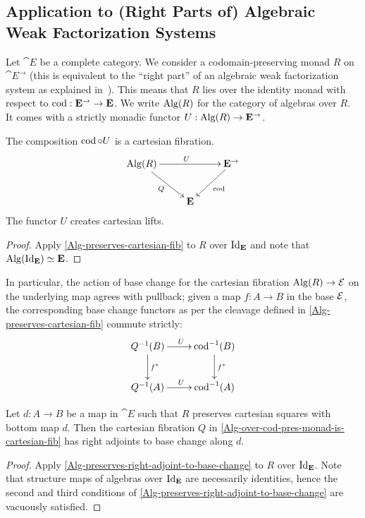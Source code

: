 \documentclass[reqno,10pt,a4paper,oneside]{amsart}
\begin{document}
\subsection{Application to (Right Parts of) Algebraic Weak Factorization Systems}

Let $\cat{E}$ be a complete category.
We consider a codomain-preserving monad $R$ on $\cat{E}^{\to}$ (this is equivalent to the ``right part'' of an algebraic weak factorization system as explained in~\cite{garner:small-object-argument}).
This means that $R$ lies over the identity monad with respect to $\operatorname{cod} : \mathbf{E}^{\to} \to \mathbf{E}$.
We write $\operatorname{Alg}(R)$ for the category of algebras over $R$.
It comes with a strictly monadic functor $U : \operatorname{Alg}(R) \to \mathbf{E}^{\to}$.

\begin{corollary}
\label{Alg-over-cod-pres-monad-is-cartesian-fib}
The composition $\operatorname{cod} \mathbin{\circ} U$ is a cartesian fibration.
\[
\xymatrix{
  \Alg(R)
  \ar[rr]^{U}
  \ar[dr]_{Q}
&&
  \cat{E}^{\to}
  \ar[dl]^{\cod}
\\&
  \cat{E}
}
\]
The functor $U$ creates cartesian lifts.
\end{corollary}

\begin{proof}
Apply \cref{Alg-preserves-cartesian-fib} to $R$ over $\operatorname{Id}_{\mathbf{E}}$ and note that $\operatorname{Alg}(\operatorname{Id}_{\mathbf{E}}) \simeq \mathbf{E}$.
\end{proof}

In particular, the action of base change for the cartesian fibration $\operatorname{Alg}(R) \to \mathcal{E}$ on the underlying map agrees with pullback; given a map $f : A \to B$ in the base $\mathcal{E}$, the corresponding base change functors as per the cleavage defined in \cref{Alg-preserves-cartesian-fib} commute strictly:
\[
\xymatrix{
  Q^{-1}(B)
  \ar[r]^{U}
  \ar[d]^{f^*}
&
  \cod^{-1}(B)
  \ar[d]^{f^*}
\\
  Q^{-1}(A)
  \ar[r]^{U}
&
  \cod^{-1}(A)
}
\]

\begin{corollary}
Let $d : A \to B$ be a map in $\cat{E}$ such that $R$ preserves cartesian squares with bottom map $d$.
Then the cartesian fibration $Q$ in \cref{Alg-over-cod-pres-monad-is-cartesian-fib} has right adjoints to base change along $d$.
\end{corollary}

\begin{proof}
Apply \cref{Alg-preserves-right-adjoint-to-base-change} to $R$ over $\operatorname{Id}_{\mathbf{E}}$.
Note that structure maps of algebras over $\operatorname{Id}_{\mathbf{E}}$ are necessarily identities, hence the second and third conditions of \cref{Alg-preserves-right-adjoint-to-base-change} are vacuously satisfied.
\end{proof}



\end{document}
